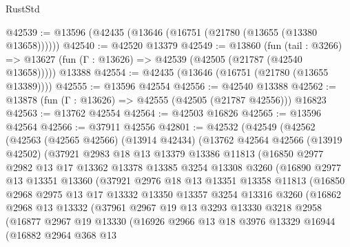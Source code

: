 \begin{lexlean}{RustStd}
\begin{coremodule}
@42539 := @13596 (@42435 (@13646 (@16751 (@21780 (@13655 (@13380 @13658))))))
@42540 := @42520 @13379
@42549 := @13860
    (fun (tail : @3266) => @13627 (fun (Γ : @13626) => @42539 (@42505 (@21787 (@42540 @13658)))))
    @13388
@42554 := @42435 (@13646 (@16751 (@21780 (@13655 @13389))))
@42555 := @13596 @42554
@42556 := @42540 @13388
@42562 := @13878 (fun (Γ : @13626) => @42555 (@42505 (@21787 @42556))) @16823
@42563 := @13762 @42554
@42564 := @42503 @16826
@42565 := @13596 @42564
@42566 := @37911 @42556
@42801 := @42532
    (@42549
      (@42562
        (@42563
          (@42565 @42566)
          (@13914 @42434)
          (@13762
            @42564
            @42566
            (@13919 @42502)
            (@37921
              @2983
              @18
              @13
              @13379
              @13386
              @11813
              (@16850
                @2977
                @2982
                @13
                @17
                @13362
                @13378
                @13385
                @3254
                @13308
                @3260
                (@16890
                  @2977
                  @13
                  @13351
                  @13360
                  (@37921
                    @2976
                    @18
                    @13
                    @13351
                    @13358
                    @11813
                    (@16850
                      @2968
                      @2975
                      @13
                      @17
                      @13332
                      @13350
                      @13357
                      @3254
                      @13316
                      @3260
                      (@16862
                        @2968
                        @13
                        @13332
                        (@37961
                          @2967
                          @19
                          @13
                          @3293
                          @13330
                          @3218
                          @2958
                          (@16877
                            @2967
                            @19
                            @13330
                            (@16926
                              @2966
                              @13
                              @18
                              @3976
                              @13329
                              @16944
                              (@16882
                                @2964
                                @368
                                @13

\end{coremodule}
\end{lexlean}
